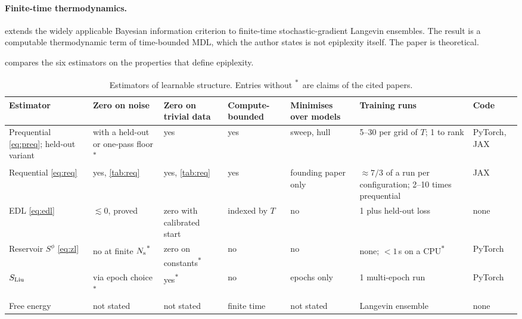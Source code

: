 \documentclass[11pt]{article}
\newcommand{\od}{\textsuperscript{$\ast$}}
\theoremstyle{tight}
\begin{document}
\paragraph{Finite-time thermodynamics.} \citet{ohzeki2026nonequilibrium} extends the widely
applicable Bayesian information criterion to finite-time stochastic-gradient Langevin ensembles. The
result is a computable thermodynamic term of time-bounded MDL, which the author states is not
epiplexity itself. The paper is theoretical.

 compares the six estimators on the properties that define epiplexity.

\begin{table}[!htb]
\centering\footnotesize
\caption{Estimators of learnable structure. Entries without \od\ are claims of the cited papers.}\label{tab:est}
\begin{tabularx}{\textwidth}{@{}P{2.9cm}P{2.1cm}P{1.6cm}P{1.4cm}P{1.6cm}LP{1.7cm}@{}}
\toprule
Estimator & Zero on noise & Zero on trivial data & Compute-bounded & Minimises over models & Training runs & Code \\
\midrule
Prequential \eqref{eq:preq}; held-out variant \citep{zhang2020transfer} & with a held-out or one-pass floor\od & yes & yes & sweep, hull & 5--30 per grid of $T$; 1 to rank & PyTorch, JAX \citep{epiplexitycode} \\
Requential \eqref{eq:req} & yes, \cref{tab:req} & yes, \cref{tab:req} & yes & founding paper only & $\approx7/3$ of a run per configuration; 2--10 times prequential & JAX \citep{requentialcode} \\
EDL \eqref{eq:edl} & $\lesssim0$, proved & zero with calibrated start & indexed by $T$ & no & 1 plus held-out loss & none \\
Reservoir $S^\phi$ \eqref{eq:zl} & no at finite $N_{\rm s}$\od & zero on constants\od & no & no & none; $<1$\,s on a CPU\od & PyTorch \citep{learnablenoveltycode} \\
$S_{\rm Liu}$ \citep{liu2026selfplay} & via epoch choice\od & yes\od & no & epochs only & 1 multi-epoch run & PyTorch \citep{selfplaycode} \\
Free energy \citep{ohzeki2026nonequilibrium} & not stated & not stated & finite time & not stated & Langevin ensemble & none \\
\bottomrule
\end{tabularx}
\end{table}
\end{document}
